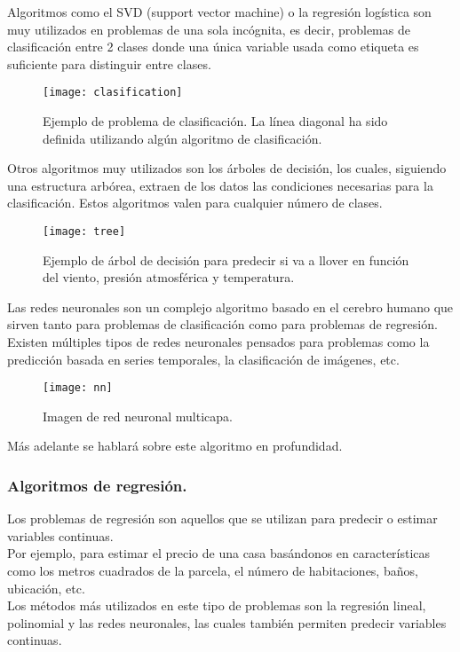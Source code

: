 \documentclass[a4paper,11pt]{article}
\begin{document}
\noindent
Algoritmos como el SVD (support vector machine) o la regresión logística son muy utilizados en problemas de una sola incógnita, es decir, problemas de clasificación entre 2 clases donde una única variable usada como etiqueta es suficiente para distinguir entre clases. 
\begin{figure}[H]
\centering
\texttt{[image: clasification]}
\caption{Ejemplo de problema de clasificación. La línea diagonal ha sido definida utilizando algún algoritmo de clasificación.}
\end{figure}
\noindent
Otros algoritmos muy utilizados son los árboles de decisión, los cuales, siguiendo una estructura arbórea, extraen de los datos las condiciones necesarias para la clasificación. Estos algoritmos valen para cualquier número de clases.
\begin{figure}[H]
\centering
\texttt{[image: tree]}
\caption{Ejemplo de árbol de decisión para predecir si va a llover en función del viento, presión atmosférica y temperatura.}
\end{figure}
\noindent
Las redes neuronales son un complejo algoritmo basado en el cerebro humano que sirven tanto para problemas de clasificación como para problemas de regresión. \\

\noindent
Existen múltiples tipos de redes neuronales pensados para problemas como la predicción basada en series temporales, la clasificación de imágenes, etc.
\begin{figure}[H]
\centering
\texttt{[image: nn]}
\caption{Imagen de red neuronal multicapa.}
\end{figure}
\noindent
Más adelante se hablará sobre este algoritmo en profundidad.

\subsubsection{Algoritmos de regresión.}
Los problemas de regresión son aquellos que se utilizan para predecir o estimar variables continuas.\\

\noindent
Por ejemplo, para estimar el precio de una casa basándonos en características como los metros cuadrados de la parcela, el número de habitaciones, baños, ubicación, etc.\\

\noindent
Los métodos más utilizados en este tipo de problemas son la regresión lineal, polinomial y las redes neuronales, las cuales también permiten predecir variables continuas.\\
\end{document}
